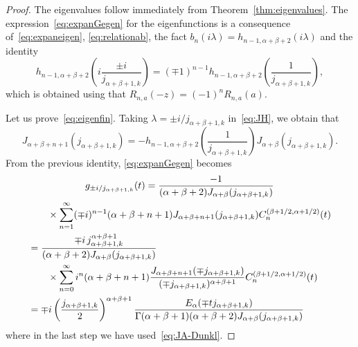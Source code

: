 \documentclass[12pt,a4paper]{amsart}
\theoremstyle{plain}
\theoremstyle{definition}
\begin{document}
\begin{proof}
The eigenvalues follow immediately from Theorem~\ref{thm:eigenvalues}.
The expression~\eqref{eq:expanGegen} for the eigenfunctions is a 
consequence of~\eqref{eq:expaneigen}, \eqref{eq:relationab}, the fact
$b_n(i\lambda) = h_{n-1,\alpha+\beta+2}(i\lambda)$ and the identity
\begin{equation*}
  h_{n-1,\alpha+\beta+2} \left(i\frac{\pm i}{j_{\alpha+\beta+1,k}}\right)
  = (\mp 1)^{n-1}h_{n-1,\alpha+\beta+2} \left(\frac{1}{ j_{\alpha+\beta+1,k}}\right),
\end{equation*}
which is obtained using that $R_{n,a}(-z)=(-1)^nR_{n,a}(a)$.

Let us prove~\eqref{eq:eigenfin}. Taking $\lambda=\pm
i/j_{\alpha+\beta+1,k}$ in~\eqref{eq:JH}, we obtain that
\[
  J_{\alpha+\beta+n+1}(j_{\alpha+\beta+1,k})
  = - h_{n-1,\alpha+\beta+2} \left(\frac{1}{j_{\alpha+\beta+1,k}}\right)
  J_{\alpha+\beta}(j_{\alpha+\beta+1,k}).
\]
From the previous identity, \eqref{eq:expanGegen} becomes
\begin{multline*}
  g_{\pm i/j_{\alpha+\beta+1,k}}(t)
  = \frac{-1}{(\alpha+\beta+2)J_{\alpha+\beta}(j_{\alpha+\beta+1,k})}\\*
\begin{aligned}
  &\kern20pt \times\sum_{n=1}^\infty (\mp i)^{n-1} (\alpha+\beta+n+1)
  J_{\alpha+\beta+n+1}(j_{\alpha+\beta+1,k})
  C_n^{(\beta+1/2,\alpha+1/2)}(t) \\
  &= \frac{\mp i\,j_{\alpha+\beta+1,k}^{\alpha+\beta+1}}
  {(\alpha+\beta+2)J_{\alpha+\beta}(j_{\alpha+\beta+1,k})} \\*
  &\kern20pt \times \sum_{n=0}^\infty i^{n}(\alpha+\beta+n+1)
  \frac{J_{\alpha+\beta+n+1}(\mp j_{\alpha+\beta+1,k})}
  {(\mp j_{\alpha+\beta+1,k})^{\alpha+\beta+1}}
  C_n^{(\beta+1/2,\alpha+1/2)}(t) \\
  &= \mp i \left( \frac{j_{\alpha+\beta+1,k}}{2}\right)^{\alpha+\beta+1}
  \frac{E_\alpha(\mp t j_{\alpha+\beta+1,k})}
  {\Gamma(\alpha+\beta+1)(\alpha+\beta+2) J_{\alpha+\beta}(j_{\alpha+\beta+1,k})}
\end{aligned}
\end{multline*}
where in the last step we have used~\eqref{eq:JA-Dunkl}.
\end{proof}
\end{document}
